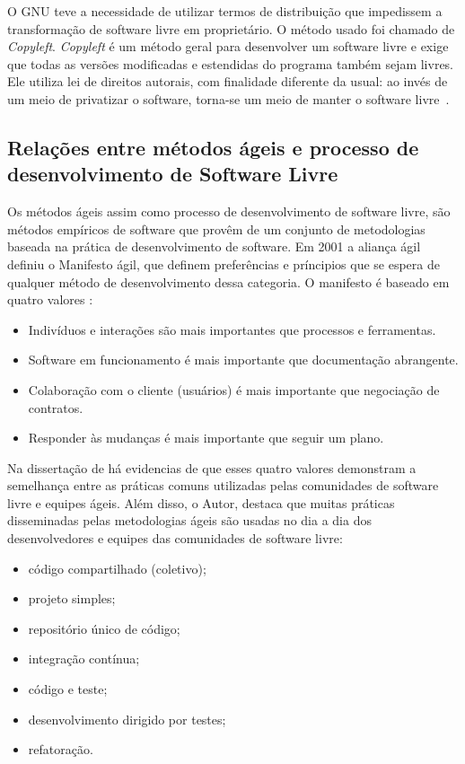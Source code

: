 O GNU teve a necessidade de utilizar termos de distribuição que impedissem a transformação de software livre em proprietário. O método usado foi chamado de \emph{Copyleft}. \emph{Copyleft} é um método geral para desenvolver um software livre e exige que todas as versões modificadas e estendidas do programa também sejam livres. Ele utiliza lei de direitos autorais, com finalidade diferente da usual: ao invés de um meio de privatizar o software, torna-se um meio de manter o software livre~\cite{stallman2009}.

\subsection{Relações entre métodos ágeis e processo de desenvolvimento de Software Livre}
\label{des-soft-livre}

Os métodos ágeis assim como processo de desenvolvimento de software livre, são métodos empíricos de software que provêm de um conjunto de metodologias baseada na prática de desenvolvimento de software. Em 2001 a aliança ágil definiu o Manifesto ágil, que definem preferências e príncipios que se espera de qualquer método de desenvolvimento dessa categoria. O manifesto é baseado em quatro valores \cite{beck2001agile}:
\begin{itemize}
\item Indivíduos e interações são mais importantes que processos e ferramentas.
\item Software em funcionamento é mais importante que documentação abrangente.
\item Colaboração com o cliente (usuários) é mais importante que negociação de contratos.
\item Responder às mudanças é mais importante que seguir um plano.
\end{itemize}

Na dissertação de  há evidencias de que esses quatro valores demonstram a semelhança entre as práticas comuns utilizadas pelas comunidades de software livre e equipes ágeis. Além disso, o Autor, destaca que muitas práticas disseminadas pelas metodologias ágeis são usadas no dia a dia dos desenvolvedores e equipes das comunidades de software livre:
\begin{itemize}
\item código compartilhado (coletivo);
\item projeto simples;
\item repositório único de código;
\item integração contínua;
\item código e teste;
\item desenvolvimento dirigido por testes;
\item refatoração.
\end{itemize}

